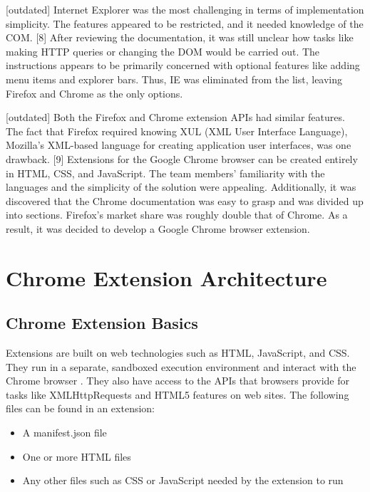 [outdated] Internet Explorer was the most challenging in terms of implementation simplicity. The features appeared to be restricted, and it needed knowledge of the COM. [8] After reviewing the documentation, it was still unclear how tasks like making HTTP queries or changing the DOM would be carried out. The instructions appears to be primarily concerned with optional features like adding menu items and explorer bars. Thus, IE was eliminated from the list, leaving Firefox and Chrome as the only options.

[outdated] Both the Firefox and Chrome extension APIs had similar features. The fact that Firefox required knowing XUL (XML User Interface Language), Mozilla's XML-based language for creating application user interfaces, was one drawback. [9] Extensions for the Google Chrome browser can be created entirely in HTML, CSS, and JavaScript. The team members' familiarity with the languages and the simplicity of the solution were appealing. Additionally, it was discovered that the Chrome documentation was easy to grasp and was divided up into sections. Firefox's market share was roughly double that of Chrome. As a result, it was decided to develop a Google Chrome browser extension.


\section{Chrome Extension Architecture}

\subsection{Chrome Extension Basics}

Extensions are built on web technologies such as HTML, JavaScript, and CSS. They run in a separate, sandboxed execution environment and interact with the Chrome browser \autocite{google2021what}. They also have access to the APIs that browsers provide for tasks like XMLHttpRequests and HTML5 features on web sites. The following files can be found in an extension:

\begin{itemize}
 \item A manifest.json file
 \item One or more HTML files
 \item Any other files such as CSS or JavaScript needed by the extension to run
\end{itemize}

